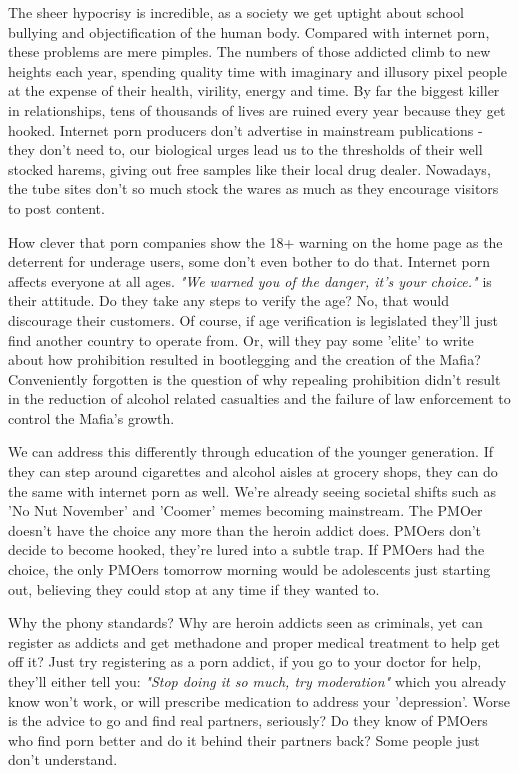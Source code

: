 \documentclass[easypeasy.tex]{subfiles}
\begin{document}
The sheer hypocrisy is incredible, as a society we get uptight about school bullying and objectification of the human body. Compared with internet porn, these problems are mere pimples. The numbers of those addicted climb to new heights each year, spending quality time with imaginary and illusory pixel people at the expense of their health, virility, energy and time. By far the biggest killer in relationships, tens of thousands of lives are ruined every year because they get hooked. Internet porn producers don't advertise in mainstream publications - they don't need to, our biological urges lead us to the thresholds of their well stocked harems, giving out free samples like their local drug dealer. Nowadays, the tube sites don't so much stock the wares as much as they encourage visitors to post content.

How clever that porn companies show the 18+ warning on the home page as the deterrent for underage users, some don't even bother to do that. Internet porn affects everyone at all ages. \textit{"We warned you of the danger, it's your choice."} is their attitude. Do they take any steps to verify the age? No, that would discourage their customers. Of course, if age verification is legislated they'll just find another country to operate from. Or, will they pay some 'elite' to write about how prohibition resulted in bootlegging and the creation of the Mafia? Conveniently forgotten is the question of why repealing prohibition didn't result in the reduction of alcohol related casualties and the failure of law enforcement to control the Mafia's growth.

We can address this differently through education of the younger generation. If they can step around cigarettes and alcohol aisles at grocery shops, they can do the same with internet porn as well. We're already seeing societal shifts such as 'No Nut November' and 'Coomer' memes becoming mainstream. The PMOer doesn't have the choice any more than the heroin addict does. PMOers don't decide to become hooked, they're lured into a subtle trap. If PMOers had the choice, the only PMOers tomorrow morning would be adolescents just starting out, believing they could stop at any time if they wanted to.

Why the phony standards? Why are heroin addicts seen as criminals, yet can register as addicts and get methadone and proper medical treatment to help get off it? Just try registering as a porn addict, if you go to your doctor for help, they'll either tell you: \textit{"Stop doing it so much, try moderation"} which you already know won't work, or will prescribe medication to address your 'depression'. Worse is the advice to go and find real partners, seriously? Do they know of PMOers who find porn better and do it behind their partners back? Some people just don't understand.
\end{document}
